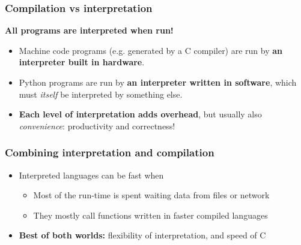 \documentclass[rgb,dvipsnames,aspectratio=169,xcolor=table]{beamer}
\begin{document}
\begin{frame}
  \frametitle{Compilation vs interpretation}

  \begin{center}
    \textbf{All programs are interpreted when run!}
  \end{center}

  \begin{itemize}
  \item Machine code programs (e.g. generated by a C compiler) are run
    by \textbf{an interpreter built in hardware}.
  \item Python programs are run by \textbf{an interpreter written in
      software}, which must \emph{itself} be interpreted by something
    else.
  \item \textbf{Each level of interpretation adds overhead}, but
    usually also \emph{convenience}: productivity and correctness!
  \end{itemize}

\end{frame}

\begin{frame}
  \frametitle{Combining interpretation and compilation}

  \begin{itemize}
  \item Interpreted languages can be fast when
    \begin{itemize}
    \item Most of the run-time is spent waiting data from files or network
    \item They mostly call functions written in faster compiled languages
    \end{itemize}
  \item \textbf{Best of both worlds:} flexibility of interpretation,
    and speed of C
  \end{itemize}

\end{frame}
\end{document}
